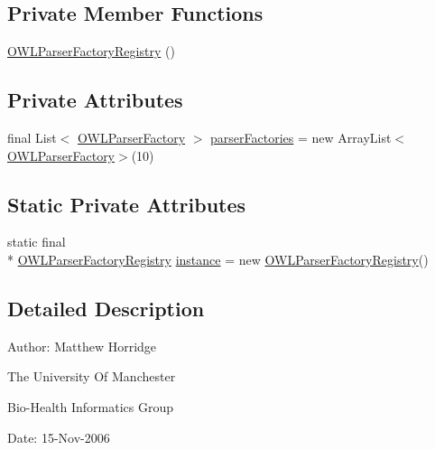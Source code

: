\subsection*{Private Member Functions}
\begin{DoxyCompactItemize}
\item 
\hyperlink{classorg_1_1semanticweb_1_1owlapi_1_1io_1_1_o_w_l_parser_factory_registry_aeaa49d30da5ca4411e4239d83c854910}{O\-W\-L\-Parser\-Factory\-Registry} ()
\end{DoxyCompactItemize}
\subsection*{Private Attributes}
\begin{DoxyCompactItemize}
\item 
final List$<$ \hyperlink{interfaceorg_1_1semanticweb_1_1owlapi_1_1io_1_1_o_w_l_parser_factory}{O\-W\-L\-Parser\-Factory} $>$ \hyperlink{classorg_1_1semanticweb_1_1owlapi_1_1io_1_1_o_w_l_parser_factory_registry_aac6622b19cf1dc11b9be77543473f8bc}{parser\-Factories} = new Array\-List$<$\hyperlink{interfaceorg_1_1semanticweb_1_1owlapi_1_1io_1_1_o_w_l_parser_factory}{O\-W\-L\-Parser\-Factory}$>$(10)
\end{DoxyCompactItemize}
\subsection*{Static Private Attributes}
\begin{DoxyCompactItemize}
\item 
static final \\*
\hyperlink{classorg_1_1semanticweb_1_1owlapi_1_1io_1_1_o_w_l_parser_factory_registry}{O\-W\-L\-Parser\-Factory\-Registry} \hyperlink{classorg_1_1semanticweb_1_1owlapi_1_1io_1_1_o_w_l_parser_factory_registry_a055642829cbf896468fd6024e9f379e7}{instance} = new \hyperlink{classorg_1_1semanticweb_1_1owlapi_1_1io_1_1_o_w_l_parser_factory_registry}{O\-W\-L\-Parser\-Factory\-Registry}()
\end{DoxyCompactItemize}


\subsection{Detailed Description}
Author\-: Matthew Horridge\par
 The University Of Manchester\par
 Bio-\/\-Health Informatics Group\par
 Date\-: 15-\/\-Nov-\/2006\par
\par
 

